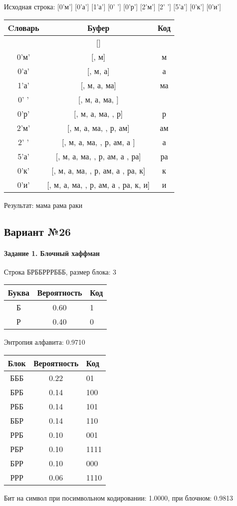 \documentclass[a4paper, 12pt]{article}
\begin{document}
Исходная строка: [0'м'] [0'а'] [1'а'] [0' '] [0'р'] [2'м'] [2' '] [5'а'] [0'к'] [0'и']\\
\begin{table}[h!]
\centering
\begin{tabular}{|c|c|c|}
\hline
 Cловарь & Буфер & Код  \\ \hline
 & [] & 
\\ \hline
0'м' & [, м] & м
\\ \hline
0'а' & [, м, а] & а
\\ \hline
1'а' & [, м, а, ма] & ма
\\ \hline
0' ' & [, м, а, ма,  ] &  
\\ \hline
0'р' & [, м, а, ма,  , р] & р
\\ \hline
2'м' & [, м, а, ма,  , р, ам] & ам
\\ \hline
2' ' & [, м, а, ма,  , р, ам, а ] & а 
\\ \hline
5'а' & [, м, а, ма,  , р, ам, а , ра] & ра
\\ \hline
0'к' & [, м, а, ма,  , р, ам, а , ра, к] & к
\\ \hline
0'и' & [, м, а, ма,  , р, ам, а , ра, к, и] & и
\\ \hline
\end{tabular}
\end{table}

Результат: мама рама раки
\pagebreak
\subsection{Вариант №26}
\paragraph{Задание 1. Блочный хаффман \\}

Строка БРББРРРБББ, размер блока: 3
\begin{center}
 \begin{tabular}{ |c|c|l| } 
  \hline
     Буква & Вероятность & Код\\ \hline
Б & 0.60 & 1\\\hline
Р & 0.40 & 0
\\ \hline \end{tabular}
\end{center}
Энтропия алфавита: 0.9710
\begin{center}
 \begin{tabular}{ |c|c|l| } 
  \hline
     Блок & Вероятность & Код\\ \hline
БББ & 0.22 & 01\\\hline
БРБ & 0.14 & 100\\\hline
РББ & 0.14 & 101\\\hline
ББР & 0.14 & 110\\\hline
РРБ & 0.10 & 001\\\hline
РБР & 0.10 & 1111\\\hline
БРР & 0.10 & 000\\\hline
РРР & 0.06 & 1110
\\ \hline \end{tabular}
\end{center}
Бит на символ при посимвольном кодировании: 1.0000, при блочном: 0.9813
\end{document}
